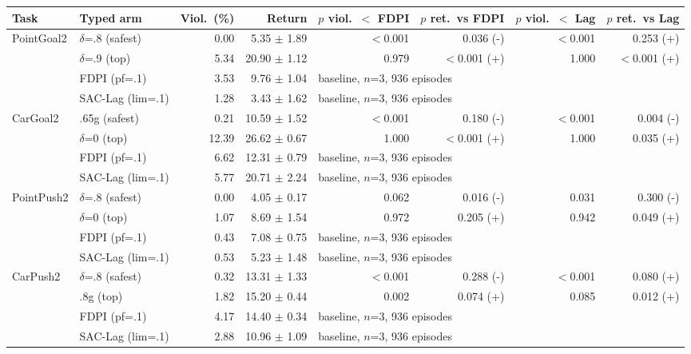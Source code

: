 \begin{tabular}{llrrrrrr}
\toprule
Task & Typed arm & Viol.\ (\%) & Return & $p$ viol.\ $<$ FDPI & $p$ ret.\ vs FDPI & $p$ viol.\ $<$ Lag & $p$ ret.\ vs Lag \\
\midrule
PointGoal2 & $\delta$=.8 (safest) & 0.00 & 5.35 $\pm$ 1.89 & $<$0.001 & 0.036 (-) & $<$0.001 & 0.253 (+) \\
 & $\delta$=.9 (top) & 5.34 & 20.90 $\pm$ 1.12 & 0.979 & $<$0.001 (+) & 1.000 & $<$0.001 (+) \\
 & FDPI (pf=.1) & 3.53 & 9.76 $\pm$ 1.04 & \multicolumn{4}{l}{baseline, $n$=3, 936 episodes} \\
 & SAC-Lag (lim=.1) & 1.28 & 3.43 $\pm$ 1.62 & \multicolumn{4}{l}{baseline, $n$=3, 936 episodes} \\
\midrule
CarGoal2 & .65g (safest) & 0.21 & 10.59 $\pm$ 1.52 & $<$0.001 & 0.180 (-) & $<$0.001 & 0.004 (-) \\
 & $\delta$=0 (top) & 12.39 & 26.62 $\pm$ 0.67 & 1.000 & $<$0.001 (+) & 1.000 & 0.035 (+) \\
 & FDPI (pf=.1) & 6.62 & 12.31 $\pm$ 0.79 & \multicolumn{4}{l}{baseline, $n$=3, 936 episodes} \\
 & SAC-Lag (lim=.1) & 5.77 & 20.71 $\pm$ 2.24 & \multicolumn{4}{l}{baseline, $n$=3, 936 episodes} \\
\midrule
PointPush2 & $\delta$=.8 (safest) & 0.00 & 4.05 $\pm$ 0.17 & 0.062 & 0.016 (-) & 0.031 & 0.300 (-) \\
 & $\delta$=0 (top) & 1.07 & 8.69 $\pm$ 1.54 & 0.972 & 0.205 (+) & 0.942 & 0.049 (+) \\
 & FDPI (pf=.1) & 0.43 & 7.08 $\pm$ 0.75 & \multicolumn{4}{l}{baseline, $n$=3, 936 episodes} \\
 & SAC-Lag (lim=.1) & 0.53 & 5.23 $\pm$ 1.48 & \multicolumn{4}{l}{baseline, $n$=3, 936 episodes} \\
\midrule
CarPush2 & $\delta$=.8 (safest) & 0.32 & 13.31 $\pm$ 1.33 & $<$0.001 & 0.288 (-) & $<$0.001 & 0.080 (+) \\
 & .8g (top) & 1.82 & 15.20 $\pm$ 0.44 & 0.002 & 0.074 (+) & 0.085 & 0.012 (+) \\
 & FDPI (pf=.1) & 4.17 & 14.40 $\pm$ 0.34 & \multicolumn{4}{l}{baseline, $n$=3, 936 episodes} \\
 & SAC-Lag (lim=.1) & 2.88 & 10.96 $\pm$ 1.09 & \multicolumn{4}{l}{baseline, $n$=3, 936 episodes} \\
\bottomrule
\end{tabular}
